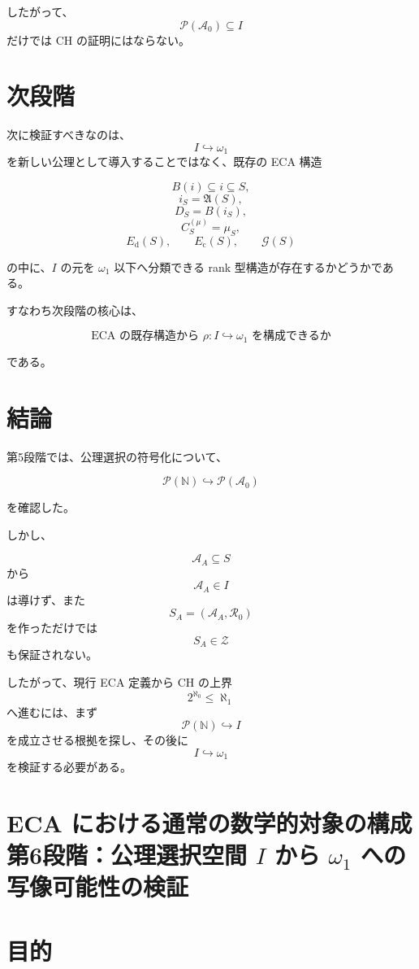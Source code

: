 \documentclass[a4paper,11pt]{article}
\begin{document}
したがって、
\[
\boxed{
\mathcal{P}(\mathcal{A}_0)\subseteq I
}
\]
だけでは CH の証明にはならない。

\section{次段階}

次に検証すべきなのは、
\[
I\hookrightarrow\omega_1
\]
を新しい公理として導入することではなく、既存の ECA 構造

\[
B(i)\subseteq i\subseteq S,
\]
\[
i_S=\mathfrak{A}(S),
\]
\[
D_S=B(i_S),
\]
\[
C_S^{(\mu)}=\mu_S,
\]
\[
E_{\mathrm d}(S),
\qquad
E_{\mathrm c}(S),
\qquad
\mathcal G(S)
\]

の中に、$I$ の元を $\omega_1$ 以下へ分類できる rank 型構造が存在するかどうかである。

すなわち次段階の核心は、

\[
\boxed{
\text{ECA の既存構造から }
\rho:I\hookrightarrow\omega_1
\text{ を構成できるか}
}
\]

である。

\section{結論}

第5段階では、公理選択の符号化について、

\[
\boxed{
\mathcal{P}(\mathbb{N})
\hookrightarrow
\mathcal{P}(\mathcal{A}_0)
}
\]

を確認した。

しかし、

\[
\mathcal{A}_A\subseteq S
\]
から
\[
\mathcal{A}_A\in I
\]
は導けず、また
\[
S_A=(\mathcal{A}_A,\mathcal{R}_0)
\]
を作っただけでは
\[
S_A\in\mathcal{Z}
\]
も保証されない。

したがって、現行 ECA 定義から CH の上界
\[
2^{\aleph_0}\leq\aleph_1
\]
へ進むには、まず
\[
\mathcal{P}(\mathbb{N})\hookrightarrow I
\]
を成立させる根拠を探し、その後に
\[
I\hookrightarrow\omega_1
\]
を検証する必要がある。







\section{ECA における通常の数学的対象の構成 \large{第6段階：公理選択空間 $I$ から $\omega_1$ への写像可能性の検証}}

\section{目的}
\end{document}
